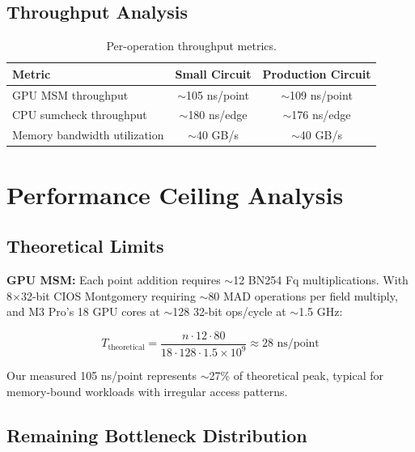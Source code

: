 \documentclass[11pt,a4paper]{article}
\begin{document}
\subsection{Throughput Analysis}

\begin{table}[H]
\centering
\begin{tabular}{lcc}
\toprule
\textbf{Metric} & \textbf{Small Circuit} & \textbf{Production Circuit} \\
\midrule
GPU MSM throughput & $\sim$105 ns/point & $\sim$109 ns/point \\
CPU sumcheck throughput & $\sim$180 ns/edge & $\sim$176 ns/edge \\
Memory bandwidth utilization & $\sim$40 GB/s & $\sim$40 GB/s \\
\bottomrule
\end{tabular}
\caption{Per-operation throughput metrics.}
\end{table}

\section{Performance Ceiling Analysis}

\subsection{Theoretical Limits}

\textbf{GPU MSM:} Each point addition requires $\sim$12 BN254 Fq multiplications. With 8$\times$32-bit CIOS Montgomery requiring $\sim$80 MAD operations per field multiply, and M3 Pro's 18 GPU cores at $\sim$128 32-bit ops/cycle at $\sim$1.5 GHz:

\[
T_{\text{theoretical}} = \frac{n \cdot 12 \cdot 80}{18 \cdot 128 \cdot 1.5 \times 10^9} \approx 28 \text{ ns/point}
\]

Our measured 105 ns/point represents $\sim$27\% of theoretical peak, typical for memory-bound workloads with irregular access patterns.

\subsection{Remaining Bottleneck Distribution}
\end{document}
